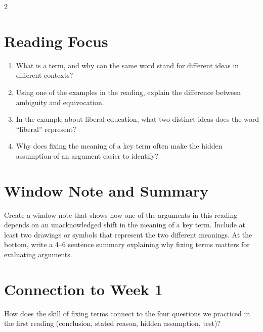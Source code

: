 \documentclass[12pt]{article}
\begin{document}
\begin{multicols}{2}
\section*{Reading Focus}
\begin{enumerate}[leftmargin=*]
\item What is a term, and why can the same word stand for different ideas in different contexts?
\item Using one of the examples in the reading, explain the difference between ambiguity and equivocation.
\item In the example about liberal education, what two distinct ideas does the word “liberal” represent?
\item Why does fixing the meaning of a key term often make the hidden assumption of an argument easier to identify?
\end{enumerate}

\section*{Window Note and Summary}
Create a window note that shows how one of the arguments in this reading depends on an unacknowledged shift in the meaning of a key term. Include at least two drawings or symbols that represent the two different meanings. At the bottom, write a 4--6 sentence summary explaining why fixing terms matters for evaluating arguments.

\section*{Connection to Week 1}
How does the skill of fixing terms connect to the four questions we practiced in the first reading (conclusion, stated reason, hidden assumption, test)?

\end{multicols}
\end{document}
